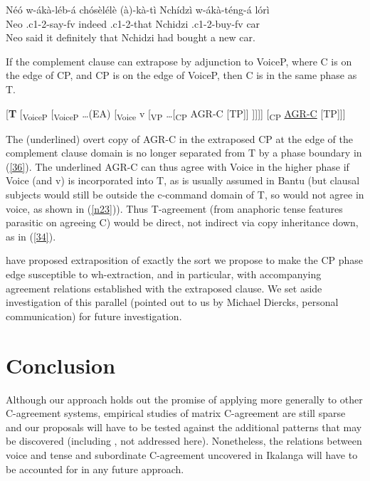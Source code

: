 \documentclass[output=paper,
modfonts
]{langscibook}
\begin{document}
\ea \label{35}
	\gll Néó w-ákà-léb-á chósèlélè (à)-kà-tì Nchídzì w-ákà-téng-á lórì  \\
	Neo .c1-2-say-fv indeed .c1-2-that Nchidzi .c1-2-buy-fv 	car	\\
	\glt Neo said it definitely that Nchidzi had bought a new car. \z

If the complement clause can extrapose by adjunction to VoiceP, where C is on the edge of CP, and CP is on the edge of VoiceP, then C is in the same phase as T.

\ea \label{36} \textup{[\textbf{T } [\textsubscript{VoiceP} [\textsubscript{VoiceP} …(EA) [\textsubscript{Voice} v [\textsubscript{VP} …}[\textsubscript{CP} AGR-C [TP]] { }\textup{]]]]} [\textsubscript{CP} \underline{AGR-C} [TP]]\textup{]} \z


The (underlined) overt copy of AGR-C in the extraposed CP at the edge of the complement clause domain is no longer separated from T by a phase boundary in (\ref{36}). The underlined AGR-C can thus agree with Voice in the higher phase if Voice (and v) is incorporated into T, as is usually assumed in Bantu (but clausal subjects would still be outside the c-command domain of T, so would not agree in voice, as shown in (\ref{n23})). Thus T-agreement (from anaphoric tense features parasitic on agreeing C) would be direct, not indirect via copy inheritance down, as in (\ref{34}). 

\citet{Rackowski2005} have proposed extraposition of exactly the sort we propose to make the CP phase edge susceptible to wh-extraction, and in particular, with accompanying agreement relations established with the extraposed clause. We set aside investigation of this parallel (pointed out to us by Michael Diercks, personal communication) for future investigation.


\section{Conclusion}

Although our approach holds out the promise of applying more generally to other  C-agreement systems, empirical studies of matrix C-agreement are still sparse and our proposals will have to be tested against the additional patterns that may be discovered (including \citealt{Diercks2017},  not addressed here). Nonetheless, the relations between voice and tense and subordinate C-agreement uncovered in Ikalanga will have to be accounted for in any future approach.
\end{document}
